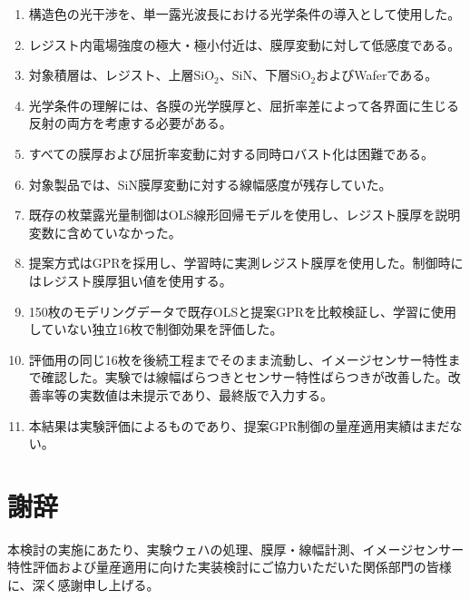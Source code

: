 \documentclass[11pt,a4paper]{ltjsarticle}
\begin{document}
\begin{enumerate}[itemsep=0.25\baselineskip]
  \item 構造色の光干渉を、単一露光波長における光学条件の導入として使用した。
  \item レジスト内電場強度の極大・極小付近は、膜厚変動に対して低感度である。
  \item 対象積層は、レジスト、上層SiO$_2$、SiN、下層SiO$_2$およびWaferである。
  \item 光学条件の理解には、各膜の光学膜厚と、屈折率差によって各界面に生じる反射の両方を考慮する必要がある。
  \item すべての膜厚および屈折率変動に対する同時ロバスト化は困難である。
  \item 対象製品では、SiN膜厚変動に対する線幅感度が残存していた。
  \item 既存の枚葉露光量制御はOLS線形回帰モデルを使用し、レジスト膜厚を説明変数に含めていなかった。
  \item 提案方式はGPRを採用し、学習時に実測レジスト膜厚を使用した。制御時にはレジスト膜厚狙い値を使用する。
  \item 150枚のモデリングデータで既存OLSと提案GPRを比較検証し、学習に使用していない独立16枚で制御効果を評価した。
  \item 評価用の同じ16枚を後続工程までそのまま流動し、イメージセンサー特性まで確認した。実験では線幅ばらつきとセンサー特性ばらつきが改善した。改善率等の実数値は未提示であり、最終版で入力する。
  \item 本結果は実験評価によるものであり、提案GPR制御の量産適用実績はまだない。
\end{enumerate}


\clearpage
\section{謝辞}

本検討の実施にあたり、実験ウェハの処理、膜厚・線幅計測、イメージセンサー特性評価および量産適用に向けた実装検討にご協力いただいた関係部門の皆様に、深く感謝申し上げる。

\printbibliography[heading=bibnumbered,title={参考文献}]
\end{document}
